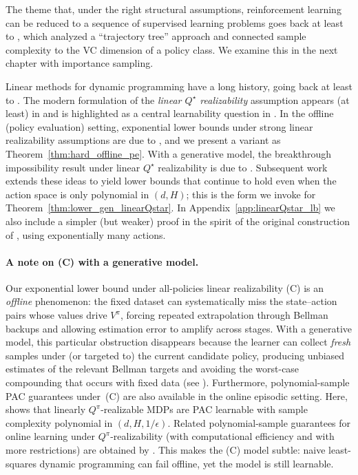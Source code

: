 The theme that, under the right structural assumptions, reinforcement learning
can be reduced to a sequence of supervised learning problems goes back at least
to \citet{NIPS1999_1664}, which analyzed a ``trajectory tree'' approach and
connected sample complexity to the VC dimension of a policy class. We
examine this in the next chapter with importance sampling.

Linear methods for dynamic programming have a long history, going back at least
to \citet{Shan50,bellman1959functional}.  The modern formulation of the
\emph{linear $Q^\star$ realizability} assumption appears (at least) in
\citet{wen2017efficient} and is highlighted as a central learnability question
in \citet{du2019good}.  In the offline (policy evaluation) setting, exponential
lower bounds under strong linear realizability assumptions are due to
\citet{wang2020statistical,zanette2021exponential}, and we present a variant as
Theorem~\ref{thm:hard_offline_pe}.  With a generative model, the breakthrough
impossibility result under linear $Q^\star$ realizability is due to
\citet{WeiszAS21}.  Subsequent work \citep{weisz2021tensorplan} extends these
ideas to yield lower bounds that continue to hold even when the action space is
only polynomial in $(d,H)$; this is the form we invoke for
Theorem~\ref{thm:lower_gen_linearQstar}.  In Appendix~\ref{app:linearQstar_lb} we
also include a simpler (but weaker) proof in the spirit of the original
construction of \citet{WeiszAS21}, using exponentially many actions.


\paragraph{A note on (C) with a generative model.}
Our exponential lower bound under all-policies linear realizability (C) is an
\emph{offline} phenomenon: the fixed dataset can systematically miss the
state--action pairs whose values drive $V^\pi$, forcing repeated extrapolation
through Bellman backups and allowing estimation error to amplify across stages.
With a generative model, this particular obstruction disappears because the
learner can collect \emph{fresh} samples under (or targeted to) the current
candidate policy, producing unbiased estimates of the relevant Bellman targets
and avoiding the worst-case compounding that occurs with fixed data (see
\citet{du2019good}).
Furthermore, polynomial-sample PAC guarantees under~(C) are also available in the
online episodic setting. Here,
\citet{weisz2023online_qpi} shows that linearly $Q^\pi$-realizable MDPs
are PAC learnable with sample complexity polynomial in
$(d,H,1/\epsilon)$.  Related polynomial-sample guarantees for online
learning under $Q^\pi$-realizability (with computational efficiency
and with more restrictions) are obtained by
\citet{mhammedi2024optimistic_psdp}.  This makes the (C) model subtle:
naive least-squares dynamic programming can fail offline, yet the model is still learnable.


